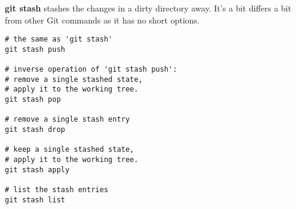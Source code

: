 %

\textbf{git stash} stashes the changes in a dirty directory away.
It's a bit differs a bit from other Git commands as it has no short options.

\begin{verbatim}
# the same as 'git stash'
git stash push

# inverse operation of 'git stash push':
# remove a single stashed state,
# apply it to the working tree.
git stash pop

# remove a single stash entry
git stash drop

# keep a single stashed state,
# apply it to the working tree.
git stash apply

# list the stash entries
git stash list
\end{verbatim}

%